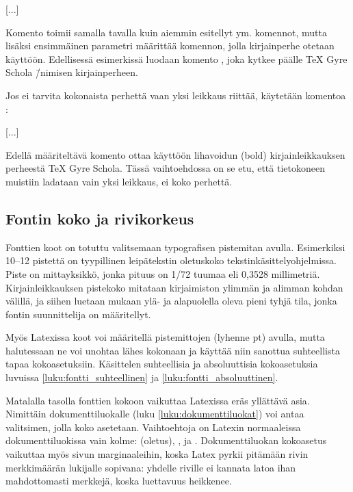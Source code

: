 \begin{koodilohkosis}
  [...]
\end{koodilohkosis}

Komento  toimii samalla tavalla kuin aiemmin
esitellyt  ym. komennot, mutta lisäksi
ensimmäinen parametri määrittää komennon, jolla kirjainperhe otetaan
käyttöön. Edellisessä esimerkissä luodaan komento , joka kytkee päälle TeX Gyre Scho\-la \=/nimisen
kirjainperheen.
          
Jos ei tarvita kokonaista perhettä vaan yksi leikkaus riittää, käytetään
komentoa :

\begin{koodilohkosis}
  [...]
\end{koodilohkosis}

Edellä määriteltävä komento  ottaa käyttöön
lihavoidun (bold) kirjainleikkauksen perheestä TeX Gyre Scho\-la. Tässä
vaih\-to\-eh\-dos\-sa on se etu, että tietokoneen muistiin ladataan vain
yksi leikkaus, ei koko perhettä.

\subsection{Fontin koko ja rivikorkeus}

Fonttien koot on totuttu valitsemaan typo\-grafisen pistemitan avulla.
Esimerkiksi 10--12 pistettä on tyypillinen leipätekstin oletuskoko
teks\-tin\-kä\-sit\-tely\-ohjel\-mis\-sa. Piste on mitta\-yksikkö, jonka
pituus on 1/72 tuumaa eli 0,3528 millimetriä. Kirjainleikkauksen
pistekoko mitataan kirjaimiston ylimmän ja alimman kohdan välillä, ja
siihen luetaan mukaan ylä- ja alapuolella oleva pieni tyhjä tila, jonka
fontin suunnittelija on määritellyt.

Myös Latexissa koot voi määritellä pistemittojen (lyhenne pt) avulla,
mutta halutessaan ne voi unohtaa lähes kokonaan ja käyttää niin sanottua
suhteellista tapaa koko\-asetuksiin. Käsittelen suhteellisia ja
absoluuttisia koko\-ase\-tuk\-sia luvuissa
\ref{luku:fontti_suhteellinen} ja \ref{luku:fontti_absoluuttinen}.

Matalalla tasolla fonttien kokoon vaikuttaa Latexissa eräs yllättävä
asia. Nimittäin dokumenttiluokalle (luku \ref{luku:dokumenttiluokat})
voi antaa valitsimen, jolla koko asetetaan. Vaihto\-ehtoja on Latexin
normaaleissa dokumenttiluokissa vain kolme: \koodi{10pt} (oletus),
\koodi{11pt}, ja \koodi{12pt}. Dokumenttiluokan koko\-asetus vaikuttaa
myös sivun marginaaleihin, koska Latex pyrkii pitämään rivin
merkkimäärän lukijalle sopivana: yhdelle riville ei kannata latoa ihan
mahdottomasti merkkejä, koska luettavuus heikkenee.

